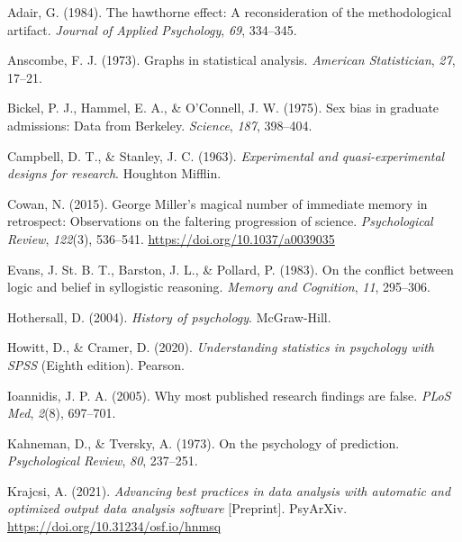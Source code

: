 \documentclass[
  11pt,
]{book}
\newlength{\cslhangindent}
\newlength{\cslentryspacingunit} %
\newenvironment{CSLReferences}[2] %
 {%
  \setlength{\parindent}{0pt}
  \ifodd #1
  \let\oldpar\par
  \def\par{\hangindent=\cslhangindent\oldpar}
  \fi
  \setlength{\parskip}{#2\cslentryspacingunit}
 }%
 {}
\theoremstyle{indenteddefinition}
\theoremstyle{indenteddefinition}
\theoremstyle{definition}
\theoremstyle{definition}
\theoremstyle{remark}
\begin{document}
\hypertarget{refs}{}
\begin{CSLReferences}{1}{0}
\leavevmode{}%
Adair, G. (1984). The hawthorne effect: A reconsideration of the methodological artifact. \emph{Journal of Applied Psychology}, \emph{69}, 334--345.

\leavevmode{}%
Anscombe, F. J. (1973). Graphs in statistical analysis. \emph{American Statistician}, \emph{27}, 17--21.

\leavevmode{}%
Bickel, P. J., Hammel, E. A., \& O'Connell, J. W. (1975). Sex bias in graduate admissions: Data from {B}erkeley. \emph{Science}, \emph{187}, 398--404.

\leavevmode{}%
Campbell, D. T., \& Stanley, J. C. (1963). \emph{Experimental and quasi-experimental designs for research}. Houghton Mifflin.

\leavevmode{}%
Cowan, N. (2015). George {Miller}'s magical number of immediate memory in retrospect: {Observations} on the faltering progression of science. \emph{Psychological Review}, \emph{122}(3), 536--541. \url{https://doi.org/10.1037/a0039035}

\leavevmode{}%
Evans, J. St. B. T., Barston, J. L., \& Pollard, P. (1983). On the conflict between logic and belief in syllogistic reasoning. \emph{Memory and Cognition}, \emph{11}, 295--306.

\leavevmode{}%
Hothersall, D. (2004). \emph{History of psychology}. McGraw-Hill.

\leavevmode{}%
Howitt, D., \& Cramer, D. (2020). \emph{Understanding statistics in psychology with {SPSS}} (Eighth edition). {Pearson}.

\leavevmode{}%
Ioannidis, J. P. A. (2005). Why most published research findings are false. \emph{PLoS Med}, \emph{2}(8), 697--701.

\leavevmode{}%
Kahneman, D., \& Tversky, A. (1973). On the psychology of prediction. \emph{Psychological Review}, \emph{80}, 237--251.

\leavevmode{}%
Krajcsi, A. (2021). \emph{Advancing best practices in data analysis with automatic and optimized output data analysis software} {[}Preprint{]}. PsyArXiv. \url{https://doi.org/10.31234/osf.io/hnmsq}


\end{CSLReferences}
\end{document}
